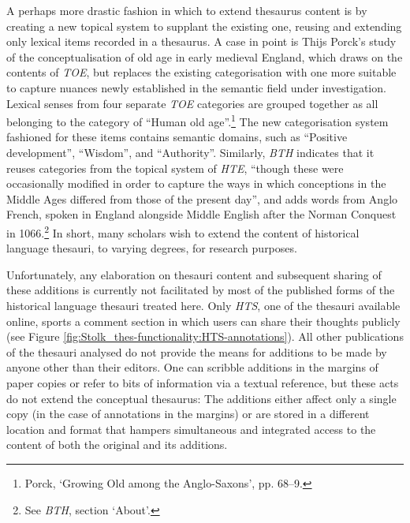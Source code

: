 A perhaps more drastic fashion in which to extend thesaurus content is by creating a new topical system to supplant the existing one, reusing and extending only lexical items recorded in a thesaurus. A case in point is Thijs Porck's study of the conceptualisation of old age in early medieval England, which draws on the contents of \textit{TOE}, but replaces the existing categorisation with one more suitable to capture nuances newly established in the semantic field under investigation. Lexical senses from four separate \textit{TOE} categories are grouped together as all belonging to the category of ``Human old age''.\footnote{Porck, `Growing Old among the Anglo-Saxons', pp. 68–9.} The new categorisation system fashioned for these items %
contains semantic domains, such as ``Positive development'', ``Wisdom'', and ``Authority''. Similarly, \textit{BTH} indicates that it reuses categories from the topical system of \textit{HTE}, ``though these were occasionally modified in order to capture the ways in which conceptions in the Middle Ages differed from those of the present day'', and adds words from Anglo French, spoken in England alongside Middle English after the Norman Conquest in 1066.\footnote{See \textit{BTH}, section `About'.} In short, many scholars wish to extend the content of historical language thesauri, to varying degrees, for research purposes.




Unfortunately, any elaboration on thesauri content and subsequent sharing of these additions is currently not facilitated by most of the published forms of the historical language thesauri treated here. Only \textit{HTS}, one of the thesauri available online, sports a comment section in which users can share their thoughts publicly (see Figure \ref{fig:Stolk_thes-functionality:HTS-annotations}). All other publications of the thesauri analysed do not provide the means for additions to be made by anyone other than their editors. One can scribble additions in the margins of paper copies or refer to bits of information via a textual reference, but these acts do not extend the conceptual thesaurus: The additions either affect only a single copy (in the case of annotations in the margins) or are stored in a different location and format that hampers simultaneous and integrated access to the content of both the original and its additions.

